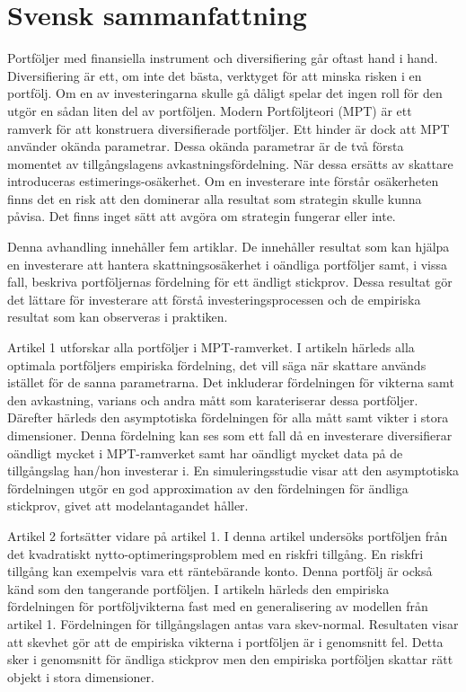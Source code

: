 \documentclass[12pt, oneside]{book}\usepackage{knitr}
\begin{document}
{\chapter{Svensk sammanfattning}

Portföljer med finansiella instrument och diversifiering går oftast hand i hand.
Diversifiering är ett, om inte det bästa, verktyget för att minska risken i en portfölj.
Om en av investeringarna skulle gå dåligt spelar det ingen roll för den utgör en sådan liten del av portföljen.
Modern Portföljteori (MPT) är ett ramverk för att konstruera diversifierade portföljer.
Ett hinder är dock att MPT använder okända parametrar.
Dessa okända parametrar är de två första momentet av tillgångslagens avkastningsfördelning.
När dessa ersätts av skattare introduceras estimerings-osäkerhet.
Om en investerare inte förstår osäkerheten finns det en risk att den dominerar alla resultat som strategin skulle kunna påvisa.
Det finns inget sätt att avgöra om strategin fungerar eller inte.

Denna avhandling innehåller fem artiklar.
De innehåller resultat som kan hjälpa en investerare att hantera skattningsosäkerhet i oändliga portföljer samt, i vissa fall, beskriva portföljernas fördelning för ett ändligt stickprov.
Dessa resultat gör det lättare för investerare att förstå investeringsprocessen och de empiriska resultat som kan observeras i praktiken.

Artikel 1 utforskar alla portföljer i MPT-ramverket.
I artikeln härleds alla optimala portföljers empiriska fördelning, det vill säga när skattare används istället för de sanna parametrarna.
Det inkluderar fördelningen för vikterna samt den avkastning, varians och andra mått som karateriserar dessa portföljer.
Därefter härleds den asymptotiska fördelningen för alla mått samt vikter i stora dimensioner.
Denna fördelning kan ses som ett fall då en investerare diversifierar oändligt mycket i MPT-ramverket samt har oändligt mycket data på de tillgångslag han/hon investerar i.
En simuleringsstudie visar att den asymptotiska fördelningen utgör en god approximation av den fördelningen för ändliga stickprov, givet att modelantagandet håller.

Artikel 2 fortsätter vidare på artikel 1.
I denna artikel undersöks portföljen från det kvadratiskt nytto-optimeringsproblem med en riskfri tillgång. 
En riskfri tillgång kan exempelvis vara ett räntebärande konto.
Denna portfölj är också känd som den tangerande portföljen.
I artikeln härleds den empiriska fördelningen för portföljvikterna fast med en generalisering av modellen från artikel 1.
Fördelningen för tillgångslagen antas vara skev-normal.
Resultaten visar att skevhet gör att de empiriska vikterna i portföljen är i genomsnitt fel.
Detta sker i genomsnitt för ändliga stickprov men den empiriska portföljen skattar rätt objekt i stora dimensioner. 

}
\end{document}

